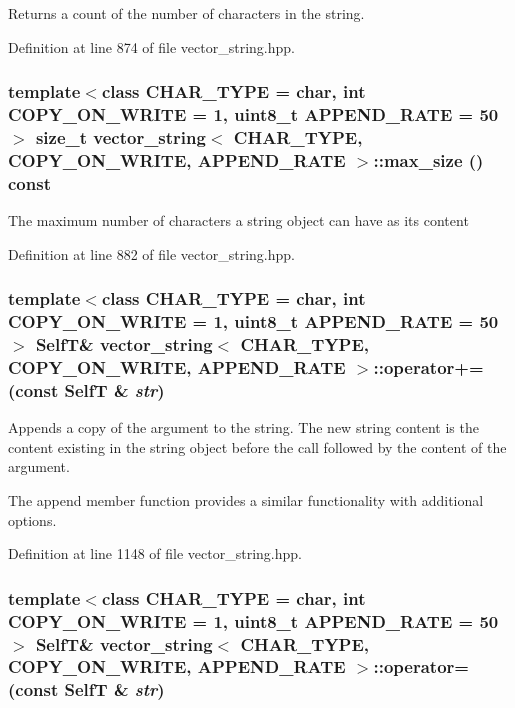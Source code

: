 Returns a count of the number of characters in the string. 

Definition at line 874 of file vector\_\-string.hpp.\hypertarget{classvector__string_d971eef9c6f24f1292a3a52d7b66d43f}{
\subsubsection[{max\_\-size}]{\setlength{\rightskip}{0pt plus 5cm}template$<$class CHAR\_\-TYPE  = char, int COPY\_\-ON\_\-WRITE = 1, uint8\_\-t APPEND\_\-RATE = 50$>$ size\_\-t {\bf vector\_\-string}$<$ CHAR\_\-TYPE, COPY\_\-ON\_\-WRITE, APPEND\_\-RATE $>$::max\_\-size () const}}
\label{classvector__string_d971eef9c6f24f1292a3a52d7b66d43f}


The maximum number of characters a string object can have as its content 

Definition at line 882 of file vector\_\-string.hpp.\hypertarget{classvector__string_1ec6b1fc1e84f88d93a40084e4e01cef}{
\subsubsection[{operator+=}]{\setlength{\rightskip}{0pt plus 5cm}template$<$class CHAR\_\-TYPE  = char, int COPY\_\-ON\_\-WRITE = 1, uint8\_\-t APPEND\_\-RATE = 50$>$ {\bf SelfT}\& {\bf vector\_\-string}$<$ CHAR\_\-TYPE, COPY\_\-ON\_\-WRITE, APPEND\_\-RATE $>$::operator+= (const {\bf SelfT} \& {\em str})}}
\label{classvector__string_1ec6b1fc1e84f88d93a40084e4e01cef}


Appends a copy of the argument to the string. The new string content is the content existing in the string object before the call followed by the content of the argument.

The append member function provides a similar functionality with additional options. 

Definition at line 1148 of file vector\_\-string.hpp.\hypertarget{classvector__string_c7b73207a93f6131906e6938819fcfa4}{
\subsubsection[{operator=}]{\setlength{\rightskip}{0pt plus 5cm}template$<$class CHAR\_\-TYPE  = char, int COPY\_\-ON\_\-WRITE = 1, uint8\_\-t APPEND\_\-RATE = 50$>$ {\bf SelfT}\& {\bf vector\_\-string}$<$ CHAR\_\-TYPE, COPY\_\-ON\_\-WRITE, APPEND\_\-RATE $>$::operator= (const {\bf SelfT} \& {\em str})}}
\label{classvector__string_c7b73207a93f6131906e6938819fcfa4}



